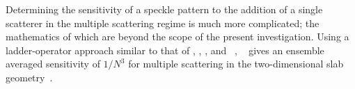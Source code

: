 Determining the sensitivity of a speckle pattern to the addition of a single
scatterer in the multiple scattering regime is much more complicated; the
mathematics of which are beyond the scope of the present investigation.  Using
a ladder-operator approach similar to that of , ,
, and ~\cite{feng1986sensitivity},
~\cite{berkovits1991sensitivity} gives an ensemble averaged
sensitivity of $1/N^3$ for multiple scattering in the two-dimensional slab
geometry~\cite{nieuwenhuizen1993role}.

